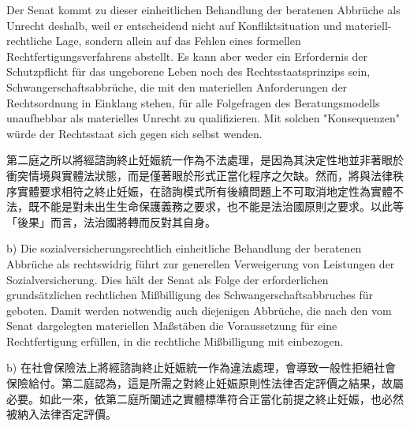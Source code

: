 \documentclass[12pt]{article}
\begin{document}
\begin{sourcepara}[title={原文SondervotumB.322}]
Der Senat kommt zu dieser einheitlichen Behandlung der beratenen Abbrüche als Unrecht deshalb, weil er entscheidend nicht auf Konfliktsituation und materiell-rechtliche Lage, sondern allein auf das Fehlen eines formellen Rechtfertigungsverfahrens abstellt. Es kann aber weder ein Erfordernis der Schutzpflicht für das ungeborene Leben noch des Rechtsstaatsprinzips sein, Schwangerschaftsabbrüche, die mit den materiellen Anforderungen der Rechtsordnung in Einklang stehen, für alle Folgefragen des Beratungsmodells unaufhebbar als materielles Unrecht zu qualifizieren. Mit solchen "Konsequenzen" würde der Rechtsstaat sich gegen sich selbst wenden.
\end{sourcepara}
\begin{transpara}
第二庭之所以將經諮詢終止妊娠統一作為不法處理，是因為其決定性地並非著眼於衝突情境與實體法狀態，而是僅著眼於形式正當化程序之欠缺。然而，將與法律秩序實體要求相符之終止妊娠，在諮詢模式所有後續問題上不可取消地定性為實體不法，既不能是對未出生生命保護義務之要求，也不能是法治國原則之要求。以此等「後果」而言，法治國將轉而反對其自身。
\end{transpara}

\begin{sourcepara}[title={原文SondervotumB.323}]
b) Die sozialversicherungsrechtlich einheitliche Behandlung der beratenen Abbrüche als rechtswidrig führt zur generellen Verweigerung von Leistungen der Sozialversicherung. Dies hält der Senat als Folge der erforderlichen grundsätzlichen rechtlichen Mißbilligung des Schwangerschaftsabbruches für geboten. Damit werden notwendig auch diejenigen Abbrüche, die nach den vom Senat dargelegten materiellen Maßstäben die Voraussetzung für eine Rechtfertigung erfüllen, in die rechtliche Mißbilligung mit einbezogen.
\end{sourcepara}
\begin{transpara}
b) 在社會保險法上將經諮詢終止妊娠統一作為違法處理，會導致一般性拒絕社會保險給付。第二庭認為，這是所需之對終止妊娠原則性法律否定評價之結果，故屬必要。如此一來，依第二庭所闡述之實體標準符合正當化前提之終止妊娠，也必然被納入法律否定評價。
\end{transpara}
\end{document}
